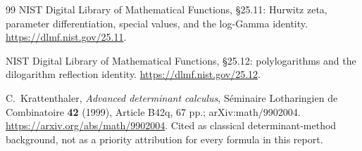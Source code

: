 \documentclass[11pt,letterpaper]{article}
\numberwithin{equation}{section}
\theoremstyle{definition}\newtheorem{definition}[theorem]{Definition}
\theoremstyle{remark}\newtheorem{remark}[theorem]{Remark}
\begin{document}
\begin{thebibliography}{99}
NIST Digital Library of Mathematical Functions,
\S25.11: Hurwitz zeta, parameter differentiation, special values,
and the log-Gamma identity.
\url{https://dlmf.nist.gov/25.11}.

NIST Digital Library of Mathematical Functions,
\S25.12: polylogarithms and the dilogarithm reflection identity.
\url{https://dlmf.nist.gov/25.12}.

C.~Krattenthaler,
\emph{Advanced determinant calculus},
S\'eminaire Lotharingien de Combinatoire \textbf{42} (1999), Article B42q,
67 pp.; arXiv:math/9902004.
\url{https://arxiv.org/abs/math/9902004}.
Cited as classical determinant-method background, not as a priority
attribution for every formula in this report.

\end{thebibliography}

\end{document}

